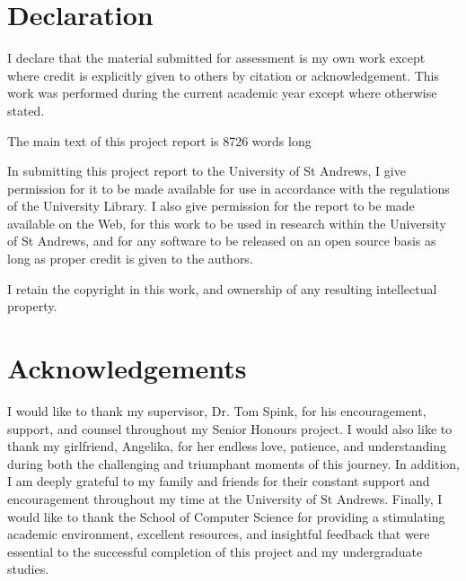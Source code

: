 \chapter*{Declaration}
I declare that the material submitted for assessment is my own work except
where credit is explicitly given to others by citation or acknowledgement. This
work was performed during the current academic year except where otherwise
stated.

The main text of this project report is 8726 words long

In submitting this project report to the University of St Andrews, I give
permission for it to be made available for use in accordance with the
regulations of the University Library. I also give permission for the report to
be made available on the Web, for this work to be used in research within the
University of St Andrews, and for any software to be released on an open source
basis as long as proper credit is given to the authors.


I retain the copyright in this work, and ownership of any resulting intellectual property.

{\let\clearpage\relax \chapter*{Acknowledgements}}
I would like to thank my supervisor, Dr. Tom Spink, for his encouragement, support, and counsel throughout my Senior Honours project. I would also like to thank my girlfriend, Angelika, for her endless love, patience, and understanding during both the challenging and triumphant moments of this journey. In addition, I am deeply grateful to my family and friends for their constant support and encouragement throughout my time at the University of St Andrews. Finally, I would like to thank the School of Computer Science for providing a stimulating academic environment, excellent resources, and insightful feedback that were essential to the successful completion of this project and my undergraduate studies.
